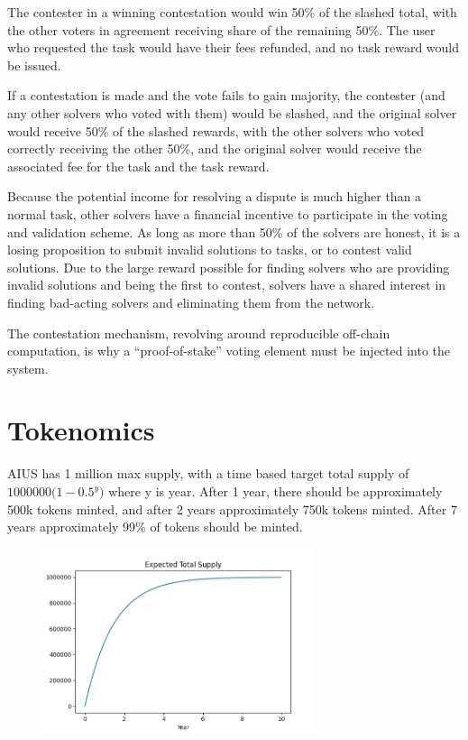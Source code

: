 \documentclass{article}
\begin{document}
The contester in a winning contestation would win 50\% of the slashed total, with the other voters in agreement receiving share of the remaining 50\%. The user who requested the task would have their fees refunded, and no task reward would be issued.

If a contestation is made and the vote fails to gain majority, the contester (and any other solvers who voted with them) would be slashed, and the original solver would receive 50\% of the slashed rewards, with the other solvers who voted correctly receiving the other 50\%, and the original solver would receive the associated fee for the task and the task reward.

Because the potential income for resolving a dispute is much higher than a normal task, other solvers have a financial incentive to participate in the voting and validation scheme. As long as more than 50\% of the solvers are honest, it is a losing proposition to submit invalid solutions to tasks, or to contest valid solutions. Due to the large reward possible for finding solvers who are providing invalid solutions and being the first to contest, solvers have a shared interest in finding bad-acting solvers and eliminating them from the network.

The contestation mechanism, revolving around reproducible off-chain computation, is why a ``proof-of-stake'' voting element must be injected into the system. 


\section{Tokenomics} \label{tokenomics}

AIUS has 1 million max supply, with a time based target total supply of $1000000(1-{0.5^{y})}$ where y is year. After 1 year, there should be approximately 500k tokens minted, and after 2 years approximately 750k tokens minted. After 7 years approximately 99\% of tokens should be minted.

\begin{figure}[H]
\includegraphics[width=8cm]{totalsupply}
\centering
\end{figure}
\end{document}
